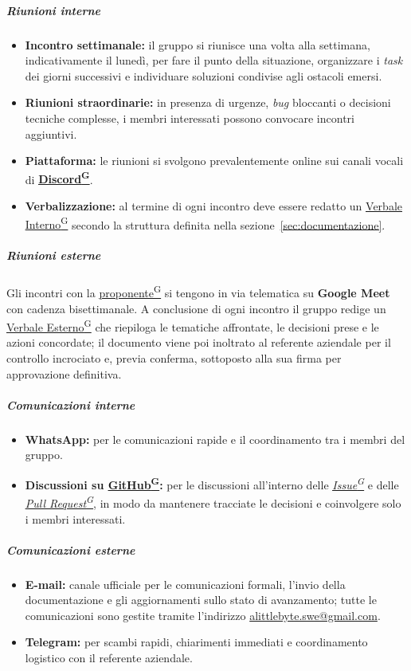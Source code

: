 \documentclass[a4paper,12pt]{article}
\providecommand{\glslink}[2]{\href{https://alittlebyte-19.github.io/Documentazione/glossario.html\#gls-#1}{\underline{#2}\textsuperscript{\scriptsize G}}}
\begin{document}
\subparagraph{Riunioni interne}
\begin{itemize}
    \item \textbf{Incontro settimanale:} il gruppo si riunisce una volta alla settimana, indicativamente il lunedì, per fare il punto della situazione, organizzare i \textit{task} dei giorni successivi e individuare soluzioni condivise agli ostacoli emersi.
    \item \textbf{Riunioni straordinarie:} in presenza di urgenze, \textit{bug} bloccanti o decisioni tecniche complesse, i membri interessati possono convocare incontri aggiuntivi.
    \item \textbf{Piattaforma:} le riunioni si svolgono prevalentemente online sui canali vocali di \textbf{\glslink{discord}{Discord}}.
    \item \textbf{Verbalizzazione:} al termine di ogni incontro deve essere redatto un \glslink{verbale-interno}{Verbale Interno} secondo la struttura definita nella sezione~\ref{sec:documentazione}.
\end{itemize}

\subparagraph{Riunioni esterne}
Gli incontri con la \glslink{committente-proponente}{proponente} si tengono in via telematica su \textbf{Google Meet} con cadenza bisettimanale. A conclusione di ogni incontro il gruppo redige un \glslink{verbale-esterno}{Verbale Esterno} che riepiloga le tematiche affrontate, le decisioni prese e le azioni concordate; il documento viene poi inoltrato al referente aziendale per il controllo incrociato e, previa conferma, sottoposto alla sua firma per approvazione definitiva.

\subparagraph{Comunicazioni interne}
\begin{itemize}
    \item \textbf{WhatsApp:} per le comunicazioni rapide e il coordinamento tra i membri del gruppo.
    \item \textbf{Discussioni su \glslink{github}{GitHub}:} per le discussioni all'interno delle \textit{\glslink{issue}{Issue}} e delle \textit{\glslink{pull-request}{Pull Request}}, in modo da mantenere tracciate le decisioni e coinvolgere solo i membri interessati.
\end{itemize}

\subparagraph{Comunicazioni esterne}
\begin{itemize}
    \item \textbf{E-mail:} canale ufficiale per le comunicazioni formali, l'invio della documentazione e gli aggiornamenti sullo stato di avanzamento; tutte le comunicazioni sono gestite tramite l'indirizzo \url{alittlebyte.swe@gmail.com}.
    \item \textbf{Telegram:} per scambi rapidi, chiarimenti immediati e coordinamento logistico con il referente aziendale.
\end{itemize}
\end{document}
